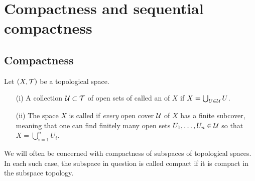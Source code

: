 \section{Compactness and sequential compactness}
\label{compactness}
\subsection{Compactness}
\begin{defn}
  Let $(X,\mathcal{T})$ be a topological space.
  \begin{enumerate}
    \item[(i)] A collection $\mathcal{U} \subset \mathcal{T}$ of open sets of called an  of $X$ if $X = \bigcup_{U \in \mathcal{U}} U$.
    \item[(ii)] The space $X$ is called  if \emph{every} open cover $\mathcal{U}$ of $X$ has a finite subcover, meaning that one can find finitely many open sets $U_1, \dots, U_n \in \mathcal{U}$ so that $X = \bigcup_{i=1}^n U_i$.
  \end{enumerate}
\end{defn}
We will often be concerned with compactness of subspaces of topological spaces. In each such case, the subspace in question is called compact if it is compact in the subspace topology.

